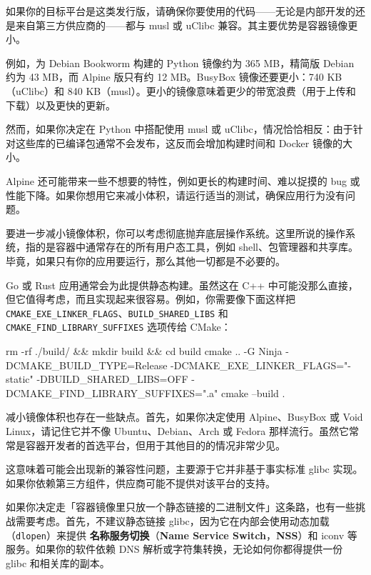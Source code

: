 如果你的目标平台是这类发行版，请确保你要使用的代码——无论是内部开发的还是来自第三方供应商的——都与 musl 或 uClibc 兼容。其主要优势是容器镜像更小。

例如，为 Debian Bookworm 构建的 Python 镜像约为 365 MB，精简版 Debian 约为 43 MB，而 Alpine 版只有约 12 MB。BusyBox 镜像还要更小：740 KB（uClibc）和 840 KB（musl）。更小的镜像意味着更少的带宽浪费（用于上传和下载）以及更快的更新。

然而，如果你决定在 Python 中搭配使用 musl 或 uClibc，情况恰恰相反：由于针对这些库的已编译包通常不会发布，这反而会增加构建时间和 Docker 镜像的大小。

Alpine 还可能带来一些不想要的特性，例如更长的构建时间、难以捉摸的 bug 或性能下降。如果你想用它来减小体积，请运行适当的测试，确保应用行为没有问题。

要进一步减小镜像体积，你可以考虑彻底抛弃底层操作系统。这里所说的操作系统，指的是容器中通常存在的所有用户态工具，例如 shell、包管理器和共享库。毕竟，如果只有你的应用要运行，那么其他一切都是不必要的。

Go 或 Rust 应用通常会为此提供静态构建。虽然这在 C++ 中可能没那么直接，但它值得考虑，而且实现起来很容易。例如，你需要像下面这样把 \texttt{CMAKE\_\allowbreak{}EXE\_\allowbreak{}LINKER\_\allowbreak{}FLAGS}、\texttt{BUILD\_\allowbreak{}SHARED\_\allowbreak{}LIBS} 和 \texttt{CMAKE\_\allowbreak{}FIND\_\allowbreak{}LIBRARY\_\allowbreak{}SUFFIXES} 选项传给 CMake：

\begin{codebox}[text]
rm -rf ./build/ && mkdir build && cd build
cmake .. -G Ninja -DCMAKE_BUILD_TYPE=Release -DCMAKE_EXE_LINKER_FLAGS="-static" -DBUILD_SHARED_LIBS=OFF -DCMAKE_FIND_LIBRARY_SUFFIXES=".a"
cmake --build .
\end{codebox}

\label{idx:1793}
减小镜像体积也存在一些缺点。首先，如果你决定使用 Alpine、BusyBox 或 Void Linux，请记住它并不像 Ubuntu、Debian、Arch 或 Fedora 那样流行。虽然它常常是容器开发者的首选平台，但用于其他目的的情况非常少见。

这意味着可能会出现新的兼容性问题，主要源于它并非基于事实标准 glibc 实现。如果你依赖第三方组件，供应商可能不提供对该平台的支持。

\label{idx:1794}
如果你决定走「容器镜像里只放一个静态链接的二进制文件」这条路，也有一些挑战需要考虑。首先，不建议静态链接 glibc，因为它在内部会使用动态加载（\texttt{dlopen}）来提供 \textbf{名称服务切换}（\textbf{Name Service Switch}，\textbf{NSS}）和 iconv 等服务。如果你的软件依赖 DNS 解析或字符集转换，无论如何你都得提供一份 glibc 和相关库的副本。

